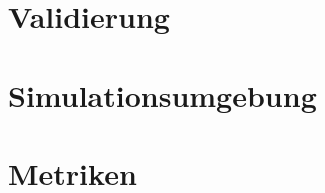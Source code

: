\section{Validierung}
\label{chap:validierung}

%
\section{Simulationsumgebung}
\label{chap:simulator}

%
\section{Metriken}
\label{chap:metriken}
